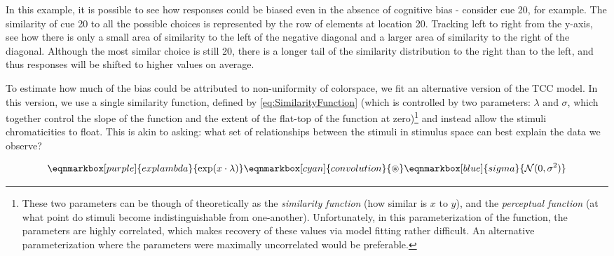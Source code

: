 In this example, it is possible to see how responses could be biased even in the absence of cognitive bias - consider cue 20, for example. 
The similarity of cue 20 to all the possible choices is represented by the row of elements at location 20. Tracking left to right from the y-axis, see how there is only a small area of similarity to the left of the negative diagonal and a larger area of similarity to the right of the diagonal. 
Although the most similar choice is still 20, there is a longer tail of the similarity distribution to the right than to the left, and thus responses will be shifted to higher values on average. %


To estimate how much of the bias could be attributed to non-uniformity of colorspace, we fit an alternative version of the TCC model. 
In this version, we use a single similarity function, defined by \autoref{eq:SimilarityFunction} (which is controlled by two parameters: $\lambda$ and $\sigma$, which together control the slope of the function and the extent of the flat-top of the function at zero)\footnote{These two parameters can be though of theoretically as the \emph{similarity function} (how similar is $x$ to $y$), and the \emph{perceptual function} (at what point do stimuli become indistinguishable from one-another). Unfortunately, in this parameterization of the function, the parameters are highly correlated, which makes recovery of these values via model fitting rather difficult. An alternative parameterization where the parameters were maximally uncorrelated would be preferable.} and instead allow the stimuli chromaticities to float.
This is akin to asking: what set of relationships between the stimuli in stimulus space can best explain the data we observe?

\renewcommand{\eqnhighlightheight}{\vphantom{\hat{H}}\mathstrut} %


\vspace{2em} 
\begin{equation} \label{eq:SimilarityFunction}
    \eqnmarkbox[purple]{explambda}{\exp(x\cdot\lambda)}
    \eqnmarkbox[cyan]{convolution}{\circledast}
    \eqnmarkbox[blue]{sigma}{\mathcal{N}(0,\sigma^2)}
\end{equation}

